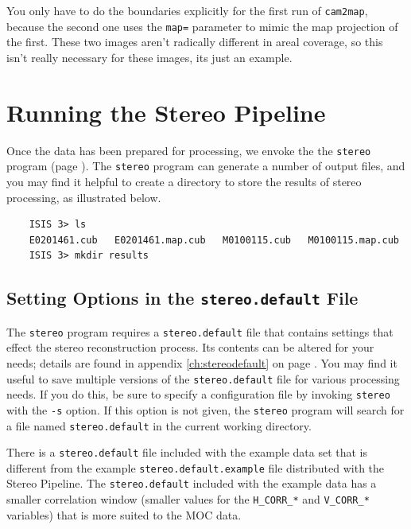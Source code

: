 You only have to do the boundaries explicitly for the first run of
\texttt{cam2map}, because the second one uses the \texttt{map=}
parameter to mimic the map projection of the first.  These two
images aren't radically different in areal coverage, so this isn't
really necessary for these images, its just an example.

\vfill

\section{Running the Stereo Pipeline}

Once the data has been prepared for processing, we envoke the the
\texttt{stereo} program (page \pageref{stereo}).  The \texttt{stereo}
program can generate a number of output files, and you may find it
helpful to create a directory to store the results of stereo
processing, as illustrated below.

\begin{verbatim}
    ISIS 3> ls
    E0201461.cub   E0201461.map.cub   M0100115.cub   M0100115.map.cub
    ISIS 3> mkdir results
\end{verbatim}
\noindent

\subsection{Setting Options in the \texttt{stereo.default} File}

The \texttt{stereo} program requires a \texttt{stereo.default} file
that contains settings that effect the stereo reconstruction process.
Its contents can be altered for your needs; details are found in
appendix \ref{ch:stereodefault} on page \pageref{ch:stereodefault}.
You may find it useful to save multiple versions of the
\texttt{stereo.default} file for various processing needs. If you do
this, be sure to specify a configuration file by invoking
\texttt{stereo} with the \texttt{-s} option.  If this option is not
given, the \texttt{stereo} program will search for a file named
\texttt{stereo.default} in the current working directory.

There is a \texttt{stereo.default} file included with the example data
set that is different from the example \texttt{stereo.default.example}
file distributed with the Stereo Pipeline.  The
\texttt{stereo.default} included with the example data has a smaller
correlation window (smaller values for the \texttt{H\_CORR\_*} and
\texttt{V\_CORR\_*} variables) that is more suited to the MOC data.

